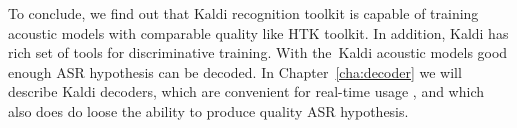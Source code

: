 To conclude, we find out that Kaldi recognition toolkit is capable of training acoustic models with comparable quality like \ac{HTK} toolkit. In addition, Kaldi has rich set of tools for discriminative training.
With the~Kaldi acoustic models good enough ASR hypothesis can be decoded. 
In Chapter~\ref{cha:decoder} we will describe Kaldi decoders, which are convenient for real-time usage
, and which also does do loose the ability to produce quality ASR hypothesis.




